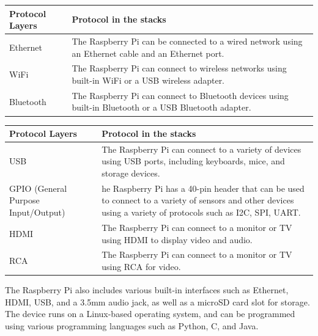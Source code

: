 \documentclass{report}
\begin{document}
\begin{multicols}{1}
{        \begin{tabular}{ | m{6em} | m{5cm} | } 
                \hline
                \textbf Protocol Layers & Protocol in the stacks\\ 
                \hline
                Ethernet & The Raspberry Pi can be connected to a wired network using an Ethernet cable and an Ethernet port. \\ 
                \hline
                WiFi & The Raspberry Pi can connect to wireless networks using built-in WiFi or a USB wireless adapter.\\ 
                \hline
                Bluetooth & The Raspberry Pi can connect to Bluetooth devices using built-in Bluetooth or a USB Bluetooth adapter.\\
                \hline
        \end{tabular}
        \begin{tabular}{ | m{6em} | m{5cm} | } 
                \hline
                \textbf Protocol Layers & Protocol in the stacks\\ 
                \hline
                USB & The Raspberry Pi can connect to a variety of devices using USB ports, including keyboards, mice, and storage devices.\\
                \hline                
                GPIO (General Purpose Input/Output) & he Raspberry Pi has a 40-pin header that can be used to connect to a variety of sensors and other devices using a variety of protocols such as I2C, SPI, UART.\\
                \hline
                HDMI & The Raspberry Pi can connect to a monitor or TV using HDMI to display video and audio.\\
                \hline
                RCA & The Raspberry Pi can connect to a monitor or TV using RCA for video.\\
                \hline
        \end{tabular}
        

        
\vspace*{0.3cm}
\textit{}

        The Raspberry Pi also includes various built-in interfaces such as Ethernet, HDMI, USB, and a 3.5mm audio jack, as well as a microSD card slot for storage. The device runs on a Linux-based operating system, and can be programmed using various programming languages such as Python, C, and Java. \\ \\ 

}
\end{multicols}
\end{document}
